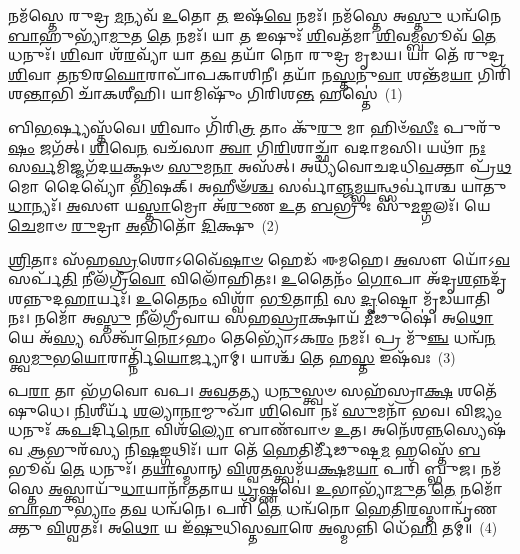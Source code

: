 \setcounter{anuvakam}{0}
𑌨𑌮᳴𑌸𑍍𑌤𑍇 𑌰𑍁𑌦𑍍𑌰 \ul{𑌮}\-𑌨𑍍𑌯𑌵᳴ \ul{𑌉}\-𑌤𑍋 \ul{𑌤} 𑌇𑌷᳴\-\ul{𑌵𑍇} 𑌨𑌮𑌃᳴। 𑌨𑌮᳴𑌸𑍍𑌤𑍇 𑌅\-\ul{𑌸𑍍𑌤𑍁} 𑌧𑌨𑍍𑌵᳴𑌨𑍇 \ul{𑌬𑌾}\-𑌹𑍁𑌭𑍍𑌯𑌾᳴\-\ul{𑌮𑍁}\-𑌤 \ul{𑌤𑍇} 𑌨𑌮𑌃᳴। 𑌯𑌾 \ul{𑌤} 𑌇𑌷𑍁𑌃᳴ \ul{𑌶𑌿}\-𑌵𑌤᳴𑌮𑌾 \ul{𑌶𑌿}\-𑌵\-\ul{𑌮𑍍𑌬}\-𑌭𑍂𑌵᳴ \ul{𑌤𑍇} 𑌧𑌨𑍁𑌃᳴। \ul{𑌶𑌿}\-𑌵𑌾 𑌶᳴\-\ul{𑌰}\-𑌵𑍍𑌯𑌾᳴ 𑌯𑌾 𑌤\-\ul{𑌵} 𑌤𑌯𑌾᳴ 𑌨𑍋 𑌰𑍁𑌦𑍍𑌰 𑌮𑍃𑌡𑌯। 𑌯𑌾 𑌤𑍇᳴ 𑌰𑍁𑌦𑍍𑌰 \ul{𑌶𑌿}\-𑌵𑌾 \ul{𑌤}\-𑌨𑍂𑌰\-\ul{𑌘𑍋}\-𑌰𑌾𑌪𑌾᳴𑌪𑌕𑌾𑌶𑌿𑌨𑍀। 𑌤𑌯𑌾᳴ 𑌨\-\ul{𑌸𑍍𑌤}\-𑌨𑍁\-\ul{𑌵𑌾} 𑌶𑌨𑍍𑌤᳴𑌮\-\ul{𑌯𑌾} 𑌗𑌿𑌰𑌿᳴𑌶\-\ul{𑌨𑍍𑌤𑌾}\-𑌭𑌿 𑌚𑌾᳴𑌕𑌶𑍀𑌹𑌿। 𑌯𑌾𑌮𑌿𑌷𑍁𑌂᳴ 𑌗𑌿𑌰𑌿𑌶\-\ul{𑌨𑍍𑌤} 𑌹𑌸𑍍𑌤𑍇॑~(1)

𑌬𑌿\-\ul{𑌭}\-𑌰𑍍𑌷𑍍𑌯𑌸𑍍𑌤᳴𑌵𑍇। \ul{𑌶𑌿}\-𑌵𑌾𑌂 𑌗𑌿᳴𑌰𑌿\-\ul{𑌤𑍍𑌰} 𑌤𑌾𑌂 𑌕𑍁᳴\-\ul{𑌰𑍁} 𑌮𑌾 𑌹𑌿𑍞᳴\-\ul{𑌸𑍀𑌃} 𑌪𑍁𑌰𑍁᳴\-\ul{𑌷𑌂} 𑌜𑌗᳴𑌤𑍍। \ul{𑌶𑌿}\-𑌵𑍇\-\ul{𑌨} 𑌵𑌚᳴𑌸𑌾 \ul{𑌤𑍍𑌵𑌾} 𑌗𑌿\-\ul{𑌰𑌿}\-𑌶𑌾𑌚𑍍𑌛𑌾᳴ 𑌵𑌦𑌾𑌮𑌸𑌿। 𑌯𑌥𑌾᳴ \ul{𑌨𑌃} 𑌸\-\ul{𑌰𑍍𑌵}\-𑌮𑌿𑌜𑍍𑌜𑌗᳴𑌦\-\ul{𑌯}\-𑌕𑍍𑌷𑍍𑌮𑍞 \ul{𑌸𑍁}\-𑌮\-\ul{𑌨𑌾} 𑌅𑌸᳴𑌤𑍍। 𑌅𑌧𑍍𑌯᳴𑌵𑍋𑌚𑌦𑌧𑌿\-\ul{𑌵}\-𑌕𑍍𑌤𑌾 𑌪𑍍𑌰᳴\-\ul{𑌥}\-𑌮𑍋 𑌦𑍈𑌵𑍍𑌯𑍋᳴ \ul{𑌭𑌿}\-𑌷𑌕𑍍। 𑌅𑌹𑍀𑍟᳴\-\ul{𑌶𑍍𑌚} 𑌸𑌰𑍍𑌵𑌾॑\-\ul{𑌞𑍍𑌜}\-𑌮𑍍𑌭\-\ul{𑌯}\-𑌨𑍍𑌥𑍍𑌸𑌰𑍍𑌵𑌾॑𑌶𑍍𑌚 𑌯𑌾𑌤𑍁\-\ul{𑌧𑌾}\-𑌨𑍍𑌯𑌃᳴। \ul{𑌅}\-𑌸𑍗 𑌯\-\ul{𑌸𑍍𑌤𑌾}\-𑌮𑍍𑌰𑍋 𑌅᳴\-\ul{𑌰𑍁}\-𑌣 \ul{𑌉}\-𑌤 \ul{𑌬}\-𑌭𑍍𑌰𑍁𑌃 𑌸𑍁᳴\-\ul{𑌮}\-𑌙𑍍𑌗𑌲𑌃᳴। 𑌯𑍇 \ul{𑌚𑍇}\-𑌮𑌾𑍞 \ul{𑌰𑍁}\-𑌦𑍍𑌰𑌾 \ul{𑌅}\-𑌭𑌿𑌤𑍋᳴ \ul{𑌦𑌿}\-𑌕𑍍𑌷𑍁~(2)

\-\ul{𑌶𑍍𑌰𑌿}\-𑌤𑌾𑌃 𑌸᳴𑌹\-\ul{𑌸𑍍𑌰}\-𑌶𑍋\-𑌽𑌵𑍈᳴\-\ul{𑌷𑌾}\-\-\ul{𑍞} 𑌹𑍇𑌡᳴ 𑌈𑌮𑌹𑍇। \ul{𑌅}\-𑌸𑍗 𑌯𑍋᳴\-𑌽\-\ul{𑌵}\-𑌸𑌰𑍍𑌪᳴\-\ul{𑌤𑌿} 𑌨𑍀𑌲᳴𑌗𑍍𑌰𑍀\-\ul{𑌵𑍋} 𑌵𑌿𑌲𑍋᳴𑌹𑌿𑌤𑌃। \ul{𑌉}\-𑌤𑍈𑌨𑌂᳴ \ul{𑌗𑍋}\-𑌪𑌾 𑌅᳴𑌦𑍃\-\ul{𑌶}\-𑌨𑍍𑌨𑌦𑍃᳴𑌶𑌨𑍍𑌨𑍁𑌦\-\ul{𑌹𑌾}\-𑌰𑍍𑌯𑌃᳴। \ul{𑌉}\-𑌤𑍈\-\ul{𑌨𑌂} 𑌵𑌿𑌶𑍍𑌵𑌾᳴ \ul{𑌭𑍂}\-𑌤𑌾\-\ul{𑌨𑌿} 𑌸 \ul{𑌦𑍃}\-𑌷𑍍𑌟𑍋 𑌮𑍃᳴𑌡𑌯𑌾𑌤𑌿 𑌨𑌃। 𑌨𑌮𑍋᳴ 𑌅\-\ul{𑌸𑍍𑌤𑍁} 𑌨𑍀𑌲᳴𑌗𑍍𑌰𑍀𑌵𑌾𑌯 𑌸𑌹\-\ul{𑌸𑍍𑌰𑌾}\-𑌕𑍍𑌷𑌾𑌯᳴ \ul{𑌮𑍀}\-𑌢𑍁𑌷𑍇॑। 𑌅\-\ul{𑌥𑍋} 𑌯𑍇 𑌅᳴\-\ul{𑌸𑍍𑌯} 𑌸𑌤𑍍𑌵𑌾᳴\-\ul{𑌨𑍋}\-\-𑌽𑌹𑌂 𑌤𑍇𑌭𑍍𑌯𑍋᳴\-𑌽𑌕\-\ul{𑌰𑌂} 𑌨𑌮𑌃᳴। 𑌪𑍍𑌰 𑌮𑍁᳴\-\ul{𑌞𑍍𑌚} 𑌧𑌨𑍍𑌵᳴\-\ul{𑌨}\-𑌸𑍍𑌤𑍍𑌵\-\ul{𑌮𑍁}\-𑌭\-\ul{𑌯𑍋}\-𑌰𑌾𑌰𑍍𑌤𑍍𑌨𑌿᳴\-\ul{𑌯𑍋}\-𑌰𑍍𑌜𑍍𑌯𑌾𑌮𑍍। 𑌯𑌾𑌶𑍍𑌚᳴ \ul{𑌤𑍇} 𑌹\-\ul{𑌸𑍍𑌤} 𑌇𑌷᳴𑌵𑌃~(3)

𑌪\-\ul{𑌰𑌾} 𑌤𑌾 𑌭᳴𑌗𑌵𑍋 𑌵𑌪। \ul{𑌅}\-\-\ul{𑌵}\-𑌤\-\ul{𑌤𑍍𑌯} 𑌧\-\ul{𑌨𑍁}\-𑌸𑍍𑌤𑍍𑌵𑍞 𑌸𑌹᳴𑌸𑍍𑌰𑌾\-\ul{𑌕𑍍𑌷} 𑌶𑌤𑍇᳴𑌷𑍁𑌧𑍇। \ul{𑌨𑌿}\-𑌶𑍀𑌰𑍍𑌯᳴ \ul{𑌶}\-𑌲𑍍𑌯𑌾\-\ul{𑌨𑌾}\-𑌮𑍍𑌮𑍁𑌖𑌾᳴ \ul{𑌶𑌿}\-𑌵𑍋 𑌨𑌃᳴ \ul{𑌸𑍁}\-𑌮𑌨𑌾᳴ 𑌭𑌵। 𑌵𑌿\-\ul{𑌜𑍍𑌯𑌂} 𑌧𑌨𑍁𑌃᳴ 𑌕\-\ul{𑌪}\-𑌰𑍍𑌦𑌿\-\ul{𑌨𑍋} 𑌵𑌿𑌶᳴\-\ul{𑌲𑍍𑌯𑍋} 𑌬𑌾𑌣᳴𑌵𑌾𑍞 \ul{𑌉}\-𑌤। 𑌅𑌨𑍇᳴𑌶\-\ul{𑌨𑍍𑌨}\-𑌸𑍍𑌯𑍇𑌷᳴𑌵 \ul{𑌆}\-𑌭𑍁𑌰᳴𑌸𑍍𑌯 𑌨𑌿\-\ul{𑌷}\-𑌙𑍍𑌗𑌥𑌿𑌃᳴। 𑌯𑌾 𑌤𑍇᳴ \ul{𑌹𑍇}\-𑌤𑌿𑌰𑍍𑌮𑍀᳴𑌢𑍁𑌷𑍍𑌟\-\ul{𑌮} 𑌹𑌸𑍍𑌤𑍇᳴ \ul{𑌬}\-𑌭𑍂𑌵᳴ \ul{𑌤𑍇} 𑌧𑌨𑍁𑌃᳴। 𑌤\-\ul{𑌯𑌾}\-𑌸𑍍𑌮𑌾𑌨𑍍 \ul{𑌵𑌿}\-𑌶𑍍𑌵\-\ul{𑌤}\-𑌸𑍍𑌤𑍍𑌵𑌮᳴𑌯\-\ul{𑌕𑍍𑌷}\-𑌮\-\ul{𑌯𑌾} 𑌪𑌰𑌿᳴ 𑌬𑍍𑌭𑍁𑌜। 𑌨𑌮᳴𑌸𑍍𑌤𑍇 \ul{𑌅}\-𑌸𑍍𑌤𑍍𑌵𑌾𑌯𑍁᳴\-\ul{𑌧𑌾}\-𑌯𑌾𑌨𑌾᳴𑌤𑌤𑌾𑌯 \ul{𑌧𑍃}\-𑌷𑍍𑌣𑌵𑍇॑। \ul{𑌉}\-𑌭𑌾𑌭𑍍𑌯𑌾᳴\-\ul{𑌮𑍁}\-𑌤 \ul{𑌤𑍇} 𑌨𑌮𑍋᳴ \ul{𑌬𑌾}\-𑌹𑍁\-\ul{𑌭𑍍𑌯𑌾𑌂} 𑌤\-\ul{𑌵} 𑌧𑌨𑍍𑌵᳴𑌨𑍇। 𑌪𑌰𑌿᳴ \ul{𑌤𑍇} 𑌧𑌨𑍍𑌵᳴𑌨𑍋 \ul{𑌹𑍇}\-𑌤𑌿\-\ul{𑌰}\-𑌸𑍍𑌮𑌾𑌨𑍍𑌵𑍃᳴𑌣𑌕𑍍𑌤𑍁 \ul{𑌵𑌿}\-𑌶𑍍𑌵𑌤𑌃᳴। 𑌅\-\ul{𑌥𑍋} 𑌯 𑌇᳴\-\ul{𑌷𑍁}\-𑌧𑌿𑌸𑍍𑌤\-\ul{𑌵𑌾}\-𑌰𑍇 \ul{𑌅}\-𑌸𑍍𑌮𑌨𑍍𑌨𑌿 𑌧𑍇᳴\-\ul{𑌹𑌿} 𑌤𑌮𑍍॥~(4)

